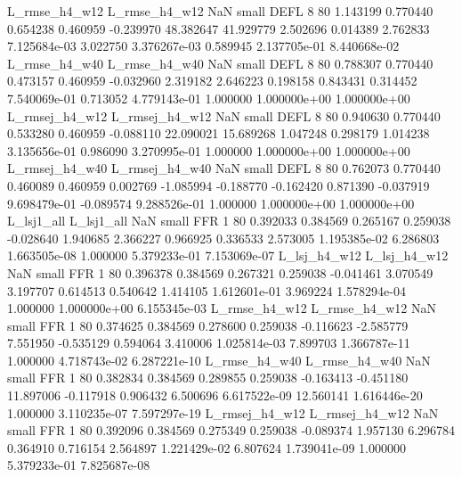  L_rmse_h4_w12  L_rmse_h4_w12                   NaN      small     DEFL                 8 80 1.143199       0.770440 0.654238       0.460959   -0.239970     48.382647     41.929779     2.502696       0.014389  2.762833 7.125684e-03     3.022750   3.376267e-03            0.589945    2.137705e-01        8.440668e-02
 L_rmse_h4_w40  L_rmse_h4_w40                   NaN      small     DEFL                 8 80 0.788307       0.770440 0.473157       0.460959   -0.032960      2.319182      2.646223     0.198158       0.843431  0.314452 7.540069e-01     0.713052   4.779143e-01            1.000000    1.000000e+00        1.000000e+00
L_rmsej_h4_w12 L_rmsej_h4_w12                   NaN      small     DEFL                 8 80 0.940630       0.770440 0.533280       0.460959   -0.088110     22.090021     15.689268     1.047248       0.298179  1.014238 3.135656e-01     0.986090   3.270995e-01            1.000000    1.000000e+00        1.000000e+00
L_rmsej_h4_w40 L_rmsej_h4_w40                   NaN      small     DEFL                 8 80 0.762073       0.770440 0.460089       0.460959    0.002769     -1.085994     -0.188770    -0.162420       0.871390 -0.037919 9.698479e-01    -0.089574   9.288526e-01            1.000000    1.000000e+00        1.000000e+00
    L_lsj1_all     L_lsj1_all                   NaN      small      FFR                 1 80 0.392033       0.384569 0.265167       0.259038   -0.028640      1.940685      2.366227     0.966925       0.336533  2.573005 1.195385e-02     6.286803   1.663505e-08            1.000000    5.379233e-01        7.153069e-07
  L_lsj_h4_w12   L_lsj_h4_w12                   NaN      small      FFR                 1 80 0.396378       0.384569 0.267321       0.259038   -0.041461      3.070549      3.197707     0.614513       0.540642  1.414105 1.612601e-01     3.969224   1.578294e-04            1.000000    1.000000e+00        6.155345e-03
 L_rmse_h4_w12  L_rmse_h4_w12                   NaN      small      FFR                 1 80 0.374625       0.384569 0.278600       0.259038   -0.116623     -2.585779      7.551950    -0.535129       0.594064  3.410006 1.025814e-03     7.899703   1.366787e-11            1.000000    4.718743e-02        6.287221e-10
 L_rmse_h4_w40  L_rmse_h4_w40                   NaN      small      FFR                 1 80 0.382834       0.384569 0.289855       0.259038   -0.163413     -0.451180     11.897006    -0.117918       0.906432  6.500696 6.617522e-09    12.560141   1.616446e-20            1.000000    3.110235e-07        7.597297e-19
L_rmsej_h4_w12 L_rmsej_h4_w12                   NaN      small      FFR                 1 80 0.392096       0.384569 0.275349       0.259038   -0.089374      1.957130      6.296784     0.364910       0.716154  2.564897 1.221429e-02     6.807624   1.739041e-09            1.000000    5.379233e-01        7.825687e-08
